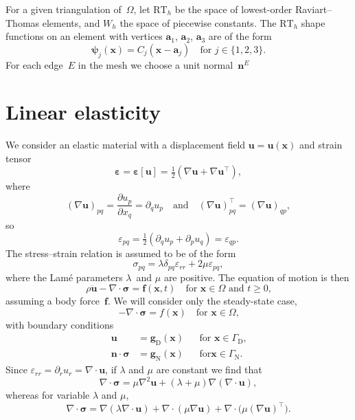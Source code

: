 \documentclass[a4paper,12pt]{article}
\newcommand{\bs}[1]{\boldsymbol{#1}}
\newcommand{\uD}{\mathrm{D}}
\newcommand{\uN}{\mathrm{N}}
\newcommand{\GammaN}{\Gamma_{\uN}}
\newcommand{\GammaD}{\Gamma_{\uD}}
\begin{document}
For a given triangulation of~$\Omega$, let $\mathrm{RT}_h$ be the space of
lowest-order Raviart--Thomas elements, and $W_h$ the space of piecewise
constants.  The $\mathrm{RT}_h$ shape functions on an element with vertices
$\bs{a}_1$, $\bs{a}_2$, $\bs{a}_3$ are of the form
\[
\bs{\psi}_j(\bs{x})=C_j(\bs{x}-\bs{a}_j)\quad\text{for $j\in\{1,2,3\}$.}
\]
For each edge~$E$ in the mesh we choose a unit normal~$\bs{n}^E$

\section{Linear elasticity}
We consider an elastic material with a displacement field
$\bs{u}=\bs{u}(\bs{x})$ and strain tensor
\[
\bs{\varepsilon}=\bs{\varepsilon}[\bs{u}]
    =\tfrac12(\nabla\bs{u}+\nabla\bs{u}^\top),
\]
where
\[
(\nabla\bs{u})_{pq}=\frac{\partial u_p}{\partial x_q}=\partial_qu_p
\quad\text{and}\quad
(\nabla\bs{u})^\top_{pq}=(\nabla\bs{u})_{qp},
\]
so
\[
\varepsilon_{pq}=\tfrac12(\partial_qu_p+\partial_pu_q)=\varepsilon_{qp}.
\]
The stress--strain relation is assumed to be of the form
\begin{equation}\label{eq: stress-strain}
\sigma_{pq}=\lambda\delta_{pq}\varepsilon_{rr}+2\mu\varepsilon_{pq},
\end{equation}
where the Lam\'e parameters $\lambda$~and $\mu$ are positive. The equation of
motion is then
\[
\rho\ddot{\bs{u}}-\nabla\cdot\bs{\sigma}=\bs{f}(\bs{x},t)
    \quad\text{for $\bs{x}\in\Omega$ and $t\ge0$,}
\]
assuming a body force~$\bs{f}$.  We will consider only the steady-state case,
\begin{equation}\label{eq: linear elasticity a}
-\nabla\cdot\bs{\sigma}=f(\bs{x})\quad\text{for $\bs{x}\in\Omega$,}
\end{equation}
with boundary conditions
\begin{equation}\label{eq: linear elasticity b}
\begin{aligned}
\bs{u}&=\bs{g}_{\mathrm{D}}(\bs{x})&&\text{for $\bs{x}\in\GammaD$,}\\
\bs{n}\cdot\bs{\sigma}&=\bs{g}_{\mathrm{N}}(\bs{x})&&\text{for
$\bs{x}\in\GammaN$.}
\end{aligned}
\end{equation}
Since $\varepsilon_{rr}=\partial_ru_r=\nabla\cdot\bs{u}$, if $\lambda$ and
$\mu$ are constant we find that
\[
\nabla\cdot\bs{\sigma}=\mu\nabla^2\bs{u}+(\lambda+\mu)\nabla(\nabla\cdot\bs{u}),
\]
whereas for variable $\lambda$ and $\mu$,
\[
\nabla\cdot\bs{\sigma}=\nabla(\lambda\nabla\cdot\bs{u})
    +\nabla\cdot(\mu\nabla\bs{u})+\nabla\cdot\bigl(\mu(\nabla\bs{u})^\top\bigr).
\]
\end{document}
